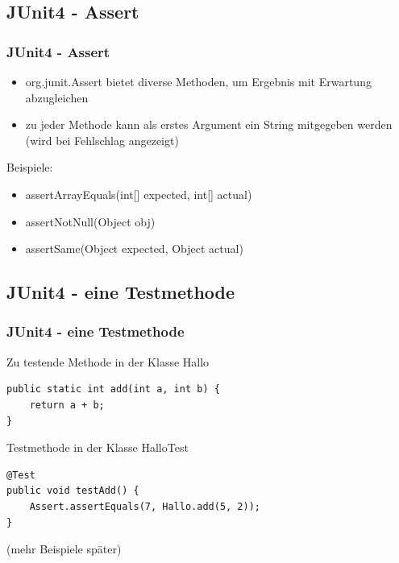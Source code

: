 \documentclass[18pt]{beamer}
\begin{document}
	\subsection{JUnit4 - Assert}
	\begin{frame}
		\frametitle{JUnit4 - Assert}
		\begin{itemize}
			\item org.junit.Assert bietet diverse Methoden, um Ergebnis mit Erwartung abzugleichen 
			\item zu jeder Methode kann als erstes Argument ein String mitgegeben werden (wird bei Fehlschlag angezeigt) \linebreak
		\end{itemize}
		Beispiele:
		\begin{itemize}
			\item assertArrayEquals(int[] expected, int[] actual)
			\item assertNotNull(Object obj)
			\item assertSame(Object expected, Object actual)
		\end{itemize}
	\end{frame}
	
	\subsection{JUnit4 - eine Testmethode}
	\begin{frame}[fragile]
		\frametitle{JUnit4 - eine Testmethode}
		\begin{block}{Zu testende Methode in der Klasse Hallo}
			\begin{verbatim}
public static int add(int a, int b) { 
	return a + b;
}
			\end{verbatim}	
		\end{block} 
		\begin{block}{Testmethode in der Klasse HalloTest}
			\begin{verbatim}
@Test
public void testAdd() {
	Assert.assertEquals(7, Hallo.add(5, 2));
}
			\end{verbatim}
		
		\end{block}
		(mehr Beispiele später)
\end{frame}
	
\end{document}

